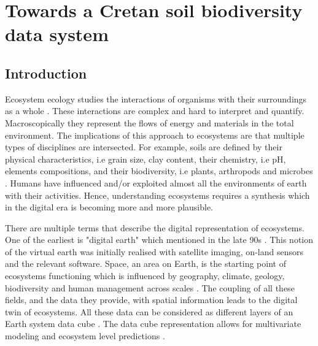 % 
% 


\chapter{Towards a Cretan soil biodiversity data system}
\label{cha:crete-idea}

\section{Introduction}\label{intro_idea}

Ecosystem ecology studies the interactions of organisms with their surroundings
as a whole \parencite{van-dyne1966ecosystems}. These interactions are complex and hard to interpret and quantify.
Macroscopically they represent the flows of energy and materials in the total environment.
The implications of this approach to ecosystems are that multiple types of disciplines 
are intersected. For example, soils are defined by their physical characteristics,
i.e grain size, clay content, their chemistry, i.e pH, elements compositions, and 
their biodiversity, i.e plants, arthropods and microbes \parencite{vogel2022}. Humans have influenced 
and/or exploited almost all the environments of earth with their activities.
Hence, understanding ecosystems requires a synthesis which in the digital era 
is becoming more and more plausible. 

There are multiple terms that describe the digital representation of ecosystems.
One of the earliest is "digital earth" which mentioned in the late 90s \parencite{Goodchild_2012}.
This notion of the virtual earth was initially realised with satellite imaging,
on-land sensors and the relevant software. Space, an area on Earth, is
the starting point of ecosystems functioning which is influenced by geography,
climate, geology, biodiversity and human management across scales \parencite{Zarnetske2019_towards}. The coupling of all these
fields, and the data they provide, with spatial information leads to the
digital twin of ecosystems. All these data can be considered as different layers
of an Earth system data cube \parencite{mahecha2020earth}. The data cube representation
allows for multivariate modeling and ecosystem level predictions \parencite{mahecha2020earth}.

